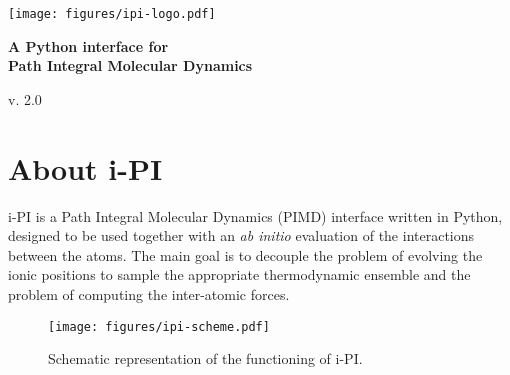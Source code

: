 \documentclass[11pt,english,fleqn]{report}
\begin{document}
\newcommand{\dd}{\; \mathrm{d}} 
\newcommand{\Tr}{\mathrm{Tr}} 
\newcommand{\bra}{< \! \!} 
\newcommand{\ket}{\! \! >} 
\newcommand{\betan}{\beta_N} 
\newcommand{\logn}{\mathrm{ln}} 
\newcommand{\expon}{\mathrm{exp}} 
\newcommand{\Imag}{\mathrm{Im}}
\newcommand{\ipi}{{i-PI}\xspace}
\newcommand{\DFT}{Quantum Espresso, CP2K, CPMD and FHI-AIMS }
\newcommand{\empirical}{LAMMPS}

\begin{titlepage} 

\begin{center}
\vspace*{2.5cm}

\par\end{center}

\begin{center}
\texttt{[image: figures/ipi-logo.pdf]}
\par\end{center}

\begin{center}
{\Large\bf A Python interface for \\Path Integral Molecular Dynamics}
\par\end{center}

\begin{center}
{\large v. 2.0}
\par\end{center}

\end{titlepage}


\tableofcontents{}


\newpage{}


\chapter{About \ipi}

\label{intro}

\ipi is a Path Integral Molecular Dynamics (PIMD) interface written
in Python, designed to be used together with an \emph{ab initio} evaluation
of the interactions between the atoms. The main goal is to decouple
the problem of evolving the ionic positions to sample the appropriate
thermodynamic ensemble and the problem of computing the inter-atomic
forces. 

\begin{figure}[hb]
\centering\texttt{[image: figures/ipi-scheme.pdf]}
\caption{\label{fig:scheme} Schematic representation of the functioning of \ipi{}.} 
\end{figure}
\end{document}

